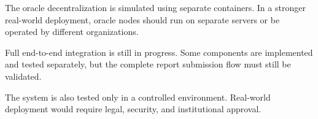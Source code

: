 The oracle decentralization is simulated using separate containers. In a stronger real-world deployment, oracle nodes should run on separate servers or be operated by different organizations.

Full end-to-end integration is still in progress. Some components are implemented and tested separately, but the complete report submission flow must still be validated.

The system is also tested only in a controlled environment. Real-world deployment would require legal, security, and institutional approval.